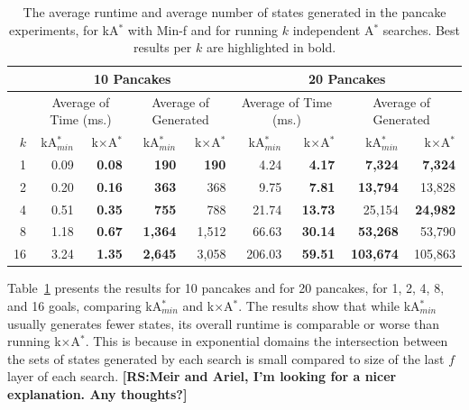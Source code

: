 \documentclass{aicom2e}
\newcommand{\astar}{A$^*$}
\newcommand{\kastar}{kA$^*$}
\newcommand{\kastarmin}{kA$^*_{min}$}
\newcommand{\kxastar}{k$\times$A$^*$}
\newcommand{\minf}{Min-f}
\newcommand{\roni}[1]{\textbf{[RS:#1]}}
\begin{document}
\begin{table}[]

		
		    \centering
		\begin{tabular}{|r|r|r|r|r|r|r|r|r|}
			\hline
			& \multicolumn{4}{c|}{{\bf 10 Pancakes}} & \multicolumn{4}{c|}{{\bf 20 Pancakes}}    \\
			\hline
			& \multicolumn{2}{c|}{Average of Time (ms.)}   & \multicolumn{2}{c|}{Average of Generated}    & \multicolumn{2}{c|}{Average of Time (ms.)}   & \multicolumn{2}{c|}{Average of Generated}    \\
			\hline
			$k$ & \kastarmin{} & \kxastar{} & \kastarmin{} & \kxastar{} & \kastarmin{} & \kxastar{} & \kastarmin{} & \kxastar{}  \\ \hline
		
1           & 0.09                  & \textbf{0.08}       & \textbf{190}          & \textbf{190}        & 4.24                  & \textbf{4.17}       & \textbf{7,324}        & \textbf{7,324}      \\
2           & 0.20                  & \textbf{0.16}       & \textbf{363}          & 368                 & 9.75                  & \textbf{7.81}       & \textbf{13,794}       & 13,828              \\
4           & 0.51                  & \textbf{0.35}       & \textbf{755}          & 788                 & 21.74                 & \textbf{13.73}      & 25,154                & \textbf{24,982}     \\
8           & 1.18                  & \textbf{0.67}       & \textbf{1,364}        & 1,512               & 66.63                 & \textbf{30.14}      & \textbf{53,268}       & 53,790              \\
16          & 3.24                  & \textbf{1.35}       & \textbf{2,645}        & 3,058               & 206.03                & \textbf{59.51}      & \textbf{103,674}       & 105,863     \\ \hline
	\end{tabular}
	\caption{The average runtime and average number of states generated in the pancake experiments, for \kastar{} with \minf{} and for running $k$ independent \astar{} searches. Best results per $k$ are highlighted in bold.}
	\label{tab:pancake-minf-k-searches}
\end{table}


Table~\ref{tab:pancake-minf-k-searches} presents the results for 10 pancakes and for 20 pancakes, for 1, 2, 4, 8, and 16 goals, comparing \kastarmin{} and \kxastar{}. 
The results show that while \kastarmin{} usually generates fewer states, its overall runtime is comparable or worse than running \kxastar{}. This is because in exponential domains the intersection between the sets of states generated by each search is small compared to size of the last $f$ layer of each search. \roni{Meir and Ariel, I'm looking for a nicer explanation. Any thoughts?}
\end{document}
